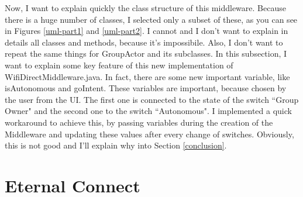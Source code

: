 Now, I want to explain quickly the class structure of this middleware. Because there is a huge number of classes, I selected only a subset of these, as you can see in Figures \ref{uml-part1} and \ref{uml-part2}.
I cannot and I don't want to explain in details all classes and methods, because it's impossibile. Also, I don't want to repeat the same things for \textsf{GroupActor} and its subclasses. In this subsection, I want to explain some key feature of this new implementation of \textsf{WifiDirectMiddleware.java}.
In fact, there are some new important variable, like \textsf{isAutonomous} and \textsf{goIntent}. These variables are important, because chosen by the user from the UI. The first one is connected to the state of the switch ``Group Owner" and the second one to the switch ``Autonomous". 
I implemented a quick workaround to achieve this, by passing variables during the creation of the Middleware and updating these values after every change of switches. Obviously, this is not good and I'll explain why into Section \ref{conclusion}.


\section{Eternal Connect}

